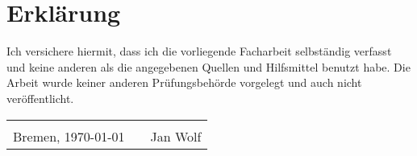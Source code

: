\documentclass[a4paper,12pt,bibliography=totoc]{scrreprt}%
\begin{document}
\clearpage


\newpage
{}
\chapter*{Erklärung}
Ich versichere hiermit, dass ich die vorliegende Facharbeit selbständig verfasst und keine anderen als die angegebenen Quellen und Hilfsmittel benutzt habe. Die Arbeit wurde keiner anderen Prüfungsbehörde vorgelegt und auch nicht veröffentlicht.
\begin{center}
\begin{tabular}{lp{2em}l} 
 \hspace{5cm}   && \hspace{4cm} \\\cline{1-1}\cline{3-3} 
 Bremen, \today    && Jan Wolf 
\end{tabular} 
\end{center}
\end{document}
